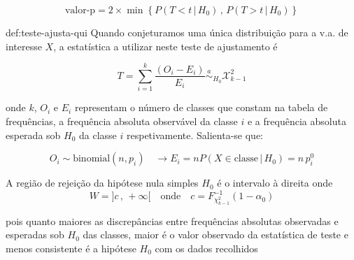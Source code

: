 $$
    \text{valor-p} = 2 \times \boxed{\min \left\{P(T < t\,|\, H_0)\,,\, P(T > t\,|\, H_0)\right\}}
$$

\begin{theo}{def:teste-ajusta-qui}\label{def:teste-ajusta-qui}
    \noindent Quando conjeturamos uma única distribuição para a v.a. de interesse $X$, a estatística a utilizar neste teste de ajustamento é

    $$
        T = \sum_{i=1}^{k} \dfrac{(O_i - E_i)}{E_i} \overset{a}{\sim}_{H_0} \mathcal{X}^2_{k - 1}
    $$

    \noindent onde $k$, $O_i$ e $E_i$ representam o número de classes que constam na tabela de frequências, a frequência absoluta observável da classe $i$ e a frequência absoluta esperada sob $H_0$ da classe $i$ respetivamente. Salienta-se que:

    $$
        O_i \sim \text{binomial}(n, p_i)\quad \rightarrow E_i = n P(X \in \text{classe}\,|\, H_0) = n\, p_i^0
    $$
    
    \noindent A região de rejeição da hipótese nula simples $H_0$ é o intervalo à direita onde
    $$
        W = ]c\,,\, +\infty[ \quad \text{onde}\quad c = F^{-1}_{\chi^2_{k - 1}}(1 - \alpha_0)
    $$

    \noindent pois quanto maiores as discrepâncias entre frequências absolutas observadas e esperadas sob $H_0$ das classes, maior é o valor observado da estatística de teste e menos consistente é a hipótese $H_0$ com os dados recolhidos
\end{theo}

